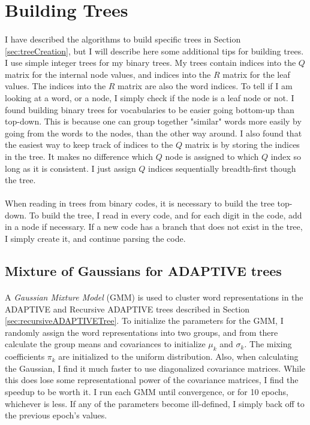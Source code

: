 \section{Building Trees}
\paragraph{}
I have described the algorithms to build specific trees in Section \ref{sec:treeCreation}, but I will describe here some additional tips for building trees. I use simple integer trees for my binary trees. My trees contain indices into the $Q$ matrix for the internal node values, and indices into the $R$ matrix for the leaf values. The indices into the $R$ matrix are also the word indices. To tell if I am looking at a word, or a node, I simply check if the node is a leaf node or not.  I found building binary trees for vocabularies to be easier going bottom-up than top-down. This is because one can group together "similar" words more easily by going from the words to the nodes, than the other way around. I also found that the easiest way to keep track of indices to the $Q$ matrix is by storing the indices in the tree. It makes no difference which $Q$ node is assigned to which $Q$ index so long as it is consistent. I just assign $Q$ indices sequentially breadth-first though the tree. 
\paragraph{}
When reading in trees from binary codes, it is necessary to build the tree top-down. To build the tree, I read in every code, and for each digit in the code, add in a node if necessary. If a new code has a branch that does not exist in the tree, I simply create it, and continue parsing the code.

\subsection{Mixture of Gaussians for ADAPTIVE trees}
\paragraph{}
A \emph{Gaussian Mixture Model} (GMM) is used to cluster word representations in the ADAPTIVE and Recursive ADAPTIVE trees described in Section \ref{sec:recursiveADAPTIVETree}. To initialize the parameters for the GMM, I randomly assign the word representations into two groups, and from there calculate the group means and covariances to initialize $\mu_k$ and $\sigma_k$. The mixing coefficients $\pi_k$ are initialized to the uniform distribution. Also, when calculating the Gaussian, I find it much faster to use diagonalized covariance matrices. While this does lose some representational power of the covariance matrices, I find the speedup to be worth it. I run each GMM until convergence, or for 10 epochs, whichever is less. If any of the parameters become ill-defined, I simply back off to the previous epoch's values. 

